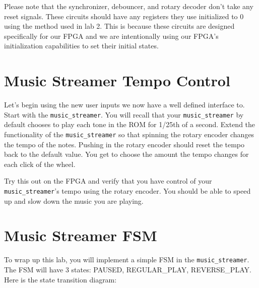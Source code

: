 \documentclass[11pt]{article}
\begin{document}
Please note that the synchronizer, debouncer, and rotary decoder don't take any reset signals. These circuits should have any registers they use initialized to 0 using the method used in lab 2. This is because these circuits are designed specifically for our FPGA and we are intentionally using our FPGA's initialization capabilities to set their initial states.

\section{Music Streamer Tempo Control}
Let's begin using the new user inputs we now have a well defined interface to. Start with the \verb|music_streamer|. You will recall that your \verb|music_streamer| by default chooses to play each tone in the ROM for 1/25th of a second. Extend the functionality of the \verb|music_streamer| so that spinning the rotary encoder changes the tempo of the notes. Pushing in the rotary encoder should reset the tempo back to the default value. You get to choose the amount the tempo changes for each click of the wheel.

Try this out on the FPGA and verify that you have control of your \verb|music_streamer|'s tempo using the rotary encoder. You should be able to speed up and slow down the music you are playing.

\section{Music Streamer FSM}
To wrap up this lab, you will implement a simple FSM in the \verb|music_streamer|. The FSM will have 3 states: PAUSED, REGULAR\_PLAY, REVERSE\_PLAY. Here is the state transition diagram:

\begin{center}
\end{center}
\end{document}
